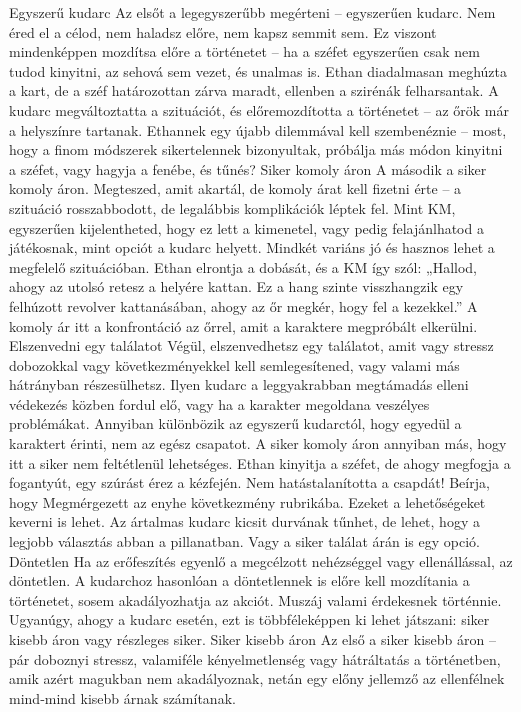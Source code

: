 \documentclass[oneside]{book}
\begin{document}
Egyszerű kudarc
Az elsőt a legegyszerűbb megérteni – egyszerűen kudarc. Nem éred el a célod, nem haladsz előre, nem kapsz semmit sem. Ez viszont mindenképpen mozdítsa előre a történetet – ha a széfet egyszerűen csak nem tudod kinyitni, az sehová sem vezet, és unalmas is.
Ethan diadalmasan meghúzta a kart, de a széf határozottan zárva maradt, ellenben a szirénák felharsantak. A kudarc megváltoztatta a szituációt, és előremozdította a történetet – az őrök már a helyszínre tartanak. Ethannek egy újabb dilemmával kell szembenéznie – most, hogy a finom módszerek sikertelennek bizonyultak, próbálja más módon kinyitni a széfet, vagy hagyja a fenébe, és tűnés?
Siker komoly áron
A második a siker komoly áron. Megteszed, amit akartál, de komoly árat kell fizetni érte – a szituáció rosszabbodott, de legalábbis komplikációk léptek fel. Mint KM, egyszerűen kijelentheted, hogy ez lett a kimenetel, vagy pedig felajánlhatod a játékosnak, mint opciót a kudarc helyett. Mindkét variáns jó és hasznos lehet a megfelelő szituációban.
Ethan elrontja a dobását, és a KM így szól: „Hallod, ahogy az utolsó retesz a helyére kattan. Ez a hang szinte visszhangzik egy felhúzott revolver kattanásában, ahogy az őr megkér, hogy fel a kezekkel.” A komoly ár itt a konfrontáció az őrrel, amit a karaktere megpróbált elkerülni.
Elszenvedni egy találatot
Végül, elszenvedhetsz egy találatot, amit vagy stressz dobozokkal vagy következményekkel kell semlegesítened, vagy valami más hátrányban részesülhetsz. Ilyen kudarc a leggyakrabban megtámadás elleni védekezés közben fordul elő, vagy ha a karakter megoldana veszélyes problémákat. Annyiban különbözik az egyszerű kudarctól, hogy egyedül a karaktert érinti, nem az egész csapatot. A siker komoly áron annyiban más, hogy itt a siker nem feltétlenül lehetséges.
Ethan kinyitja a széfet, de ahogy megfogja a fogantyút, egy szúrást érez a kézfején. Nem hatástalanította a csapdát! Beírja, hogy Megmérgezett az enyhe következmény rubrikába.
Ezeket a lehetőségeket keverni is lehet. Az ártalmas kudarc kicsit durvának tűnhet, de lehet, hogy a legjobb választás abban a pillanatban. Vagy a siker találat árán is egy opció.
Döntetlen
Ha az erőfeszítés egyenlő a megcélzott nehézséggel vagy ellenállással, az döntetlen.
A kudarchoz hasonlóan a döntetlennek is előre kell mozdítania a történetet, sosem akadályozhatja az akciót. Muszáj valami érdekesnek történnie. Ugyanúgy, ahogy a kudarc esetén, ezt is többféleképpen ki lehet játszani: siker kisebb áron vagy részleges siker.
Siker kisebb áron
Az első a siker kisebb áron – pár doboznyi stressz, valamiféle kényelmetlenség vagy hátráltatás a történetben, amik azért magukban nem akadályoznak, netán egy előny jellemző az ellenfélnek mind‑mind kisebb árnak számítanak.
\end{document}
